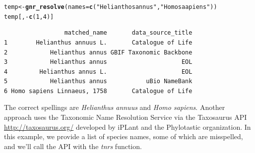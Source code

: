\documentclass[10pt,a4paper,twocolumn]{article}
\makeatletter
\newcommand{\hlfunctioncall}[1]{\textcolor[rgb]{0.501960784313725,0,0.329411764705882}{\textbf{#1}}}%
\newcommand{\hlstring}[1]{\textcolor[rgb]{0.6,0.6,1}{#1}}%
\newenvironment{kframe}{%
 \def\at@end@of@kframe{}%
 \ifinner\ifhmode%
  \def\at@end@of@kframe{\end{minipage}}%
  \begin{minipage}{\columnwidth}%
 \fi\fi%
 \def\FrameCommand##1{\hskip\@totalleftmargin \hskip-\fboxsep
 \colorbox{shadecolor}{##1}\hskip-\fboxsep
     \hskip-\linewidth \hskip-\@totalleftmargin \hskip\columnwidth}%
 \MakeFramed {\advance\hsize-\width
   \@totalleftmargin\z@ \linewidth\hsize
   \@setminipage}}%
 {\par\unskip\endMakeFramed%
 \at@end@of@kframe}
\newenvironment{knitrout}{}{} %
\makeatother
\begin{document}
\begin{knitrout}
\begin{scriptsize}
\color{fgcolor}\begin{kframe}
\begin{alltt}
temp <- \hlfunctioncall{gnr_resolve}(names = \hlfunctioncall{c}(\hlstring{"Helianthos annus"}, \newline \hlstring{"Homo saapiens"}))
temp[, -\hlfunctioncall{c}(1, 4)]
\end{alltt}
\begin{verbatim}
                 matched_name       data_source_title
1        Helianthus annuus L.       Catalogue of Life
2            Helianthus annus GBIF Taxonomic Backbone
3            Helianthus annus                     EOL
4         Helianthus annus L.                     EOL
5            Helianthus annus           uBio NameBank
6 Homo sapiens Linnaeus, 1758       Catalogue of Life
\end{verbatim}
\end{kframe}
\end{scriptsize}
\end{knitrout}


The correct spellings are \emph{Helianthus annuus} and \emph{Homo sapiens}. Another approach uses the Taxonomic Name Resolution Service via the Taxosaurus API \url{http://taxosaurus.org/} developed by iPLant and the Phylotastic organization. In this example, we provide a list of species names, some of which are misspelled, and we'll call the API with the \emph{tnrs} function.
\end{document}
